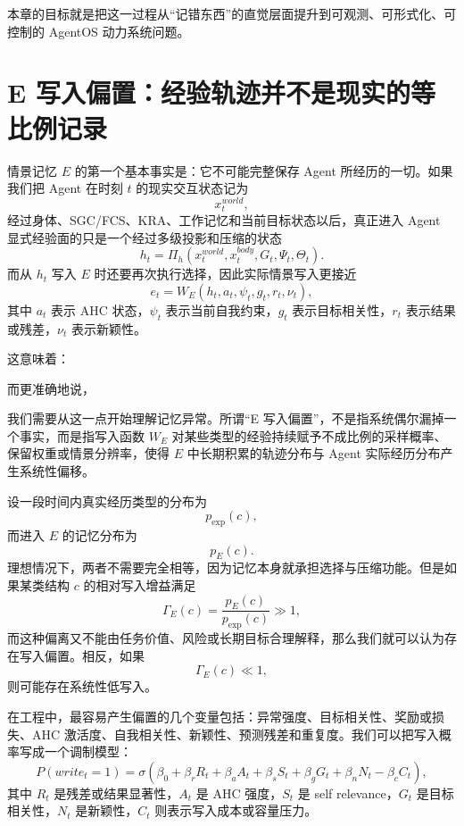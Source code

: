 本章的目标就是把这一过程从“记错东西”的直觉层面提升到可观测、可形式化、可控制的 AgentOS 动力系统问题。

\section{E 写入偏置：经验轨迹并不是现实的等比例记录}
\label{sec:episodic-write-bias}

情景记忆 $E$ 的第一个基本事实是：它不可能完整保存 Agent 所经历的一切。如果我们把 Agent 在时刻 $t$ 的现实交互状态记为
\[
x_t^{world},
\]
经过身体、SGC/FCS、KRA、工作记忆和当前目标状态以后，真正进入 Agent 显式经验面的只是一个经过多级投影和压缩的状态
\[
h_t=\Pi_h(x_t^{world},x_t^{body},G_t,\Psi_t,\Theta_t).
\]
而从 $h_t$ 写入 $E$ 时还要再次执行选择，因此实际情景写入更接近
\[
e_t=W_E(h_t,a_t,\psi_t,g_t,r_t,\nu_t),
\]
其中 $a_t$ 表示 AHC 状态，$\psi_t$ 表示当前自我约束，$g_t$ 表示目标相关性，$r_t$ 表示结果或残差，$\nu_t$ 表示新颖性。

这意味着：
\begin{statementbox}
\centering
{}
\end{statementbox}
而更准确地说，
\begin{statementbox}
\centering
{}
\end{statementbox}

我们需要从这一点开始理解记忆异常。所谓“E 写入偏置”，不是指系统偶尔漏掉一个事实，而是指写入函数 $W_E$ 对某些类型的经验持续赋予不成比例的采样概率、保留权重或情景分辨率，使得 $E$ 中长期积累的轨迹分布与 Agent 实际经历分布产生系统性偏移。

设一段时间内真实经历类型的分布为
\[
p_{\mathrm{exp}}(c),
\]
而进入 $E$ 的记忆分布为
\[
p_E(c).
\]
理想情况下，两者不需要完全相等，因为记忆本身就承担选择与压缩功能。但是如果某类结构 $c$ 的相对写入增益满足
\[
\Gamma_E(c)
=
\frac{p_E(c)}{p_{\mathrm{exp}}(c)}
\gg 1,
\]
而这种偏离又不能由任务价值、风险或长期目标合理解释，那么我们就可以认为存在写入偏置。相反，如果
\[
\Gamma_E(c)\ll 1,
\]
则可能存在系统性低写入。

在工程中，最容易产生偏置的几个变量包括：异常强度、目标相关性、奖励或损失、AHC 激活度、自我相关性、新颖性、预测残差和重复度。我们可以把写入概率写成一个调制模型：
\[
P(write_t=1)
=
\sigma
\left(
\beta_0
+\beta_rR_t
+\beta_aA_t
+\beta_sS_t
+\beta_gG_t
+\beta_nN_t
-\beta_cC_t
\right),
\]
其中 $R_t$ 是残差或结果显著性，$A_t$ 是 AHC 强度，$S_t$ 是 self relevance，$G_t$ 是目标相关性，$N_t$ 是新颖性，$C_t$ 则表示写入成本或容量压力。

